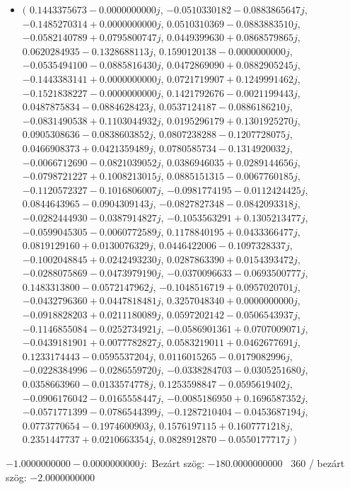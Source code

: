 \documentclass[14pt,a4paper]{article}
\begin{document}
\begin{itemize}
\item
$\big($
$0.1443375673-0.0000000000j$, $-0.0510330182-0.0883865647j$, $-0.1485270314+0.0000000000j$, $0.0510310369-0.0883883510j$, $-0.0582140789+0.0795800747j$, $0.0449399630+0.0868579865j$, $0.0620284935-0.1328688113j$, $0.1590120138-0.0000000000j$, $-0.0535494100-0.0885816430j$, $0.0472869090+0.0882905245j$, $-0.1443383141+0.0000000000j$, $0.0721719907+0.1249991462j$, $-0.1521838227-0.0000000000j$, $0.1421792676-0.0021199443j$, $0.0487875834-0.0884628423j$, $0.0537124187-0.0886186210j$, $-0.0831490538+0.1103044932j$, $0.0195296179+0.1301925270j$, $0.0905308636-0.0838603852j$, $0.0807238288-0.1207728075j$, $0.0466908373+0.0421359489j$, $0.0780585734-0.1314920032j$, $-0.0066712690-0.0821039052j$, $0.0386946035+0.0289144656j$, $-0.0798721227+0.1008213015j$, $0.0885151315-0.0067760185j$, $-0.1120572327-0.1016806007j$, $-0.0981774195-0.0112424425j$, $0.0844643965-0.0904309143j$, $-0.0827827348-0.0842093318j$, $-0.0282444930-0.0387914827j$, $-0.1053563291+0.1305213477j$, $-0.0599045305-0.0060772589j$, $0.1178840195+0.0433366477j$, $0.0819129160+0.0130076329j$, $0.0446422006-0.1097328337j$, $-0.1002048845+0.0242493230j$, $0.0287863390+0.0154393472j$, $-0.0288075869-0.0473979190j$, $-0.0370096633-0.0693500777j$, $0.1483313800-0.0572147962j$, $-0.1048516719+0.0957020701j$, $-0.0432796360+0.0447818481j$, $0.3257048340+0.0000000000j$, $-0.0918828203+0.0211180089j$, $0.0597202142-0.0506543937j$, $-0.1146855084-0.0252734921j$, $-0.0586901361+0.0707009071j$, $-0.0439181901+0.0077782827j$, $0.0583219011+0.0462677691j$, $0.1233174443-0.0595537204j$, $0.0116015265-0.0179082996j$, $-0.0228384996-0.0286559720j$, $-0.0338284703-0.0305251680j$, $0.0358663960-0.0133574778j$, $0.1253598847-0.0595619402j$, $-0.0906176042-0.0165558447j$, $-0.0085186950+0.1696587352j$, $-0.0571771399-0.0786544399j$, $-0.1287210404-0.0453687194j$, $0.0773770654-0.1974600903j$, $0.1576197115+0.1607771218j$, $0.2351447737+0.0210663354j$, $0.0828912870-0.0550177717j$
$\big)$
\end{itemize}
$-1.0000000000-0.0000000000j$:\
Bezárt szög: $-180.0000000000$ \
360 / bezárt szög: $-2.0000000000$\
\end{document}
